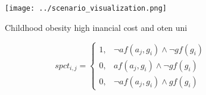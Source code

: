 \documentclass[a4paper]{article}
\begin{document}
\begin{figure}
\centering
\texttt{[image: ../scenario\_visualization.png]}
\caption{Childhood obesity high inancial cost and oten uni
}
\end{figure}
 
\begin{equation}
spct_{i,j} =
\begin{cases}
1, & \text{$\neg af(a_j,g_i) \wedge \neg gf(g_i)$}\\
0, & \text{$af(a_j,g_i) \wedge \neg gf(g_i)$}\\
0, & \text{$\neg af(a_j,g_i) \wedge gf(g_i)$}
\end{cases}
\end{equation}
\end{document}
